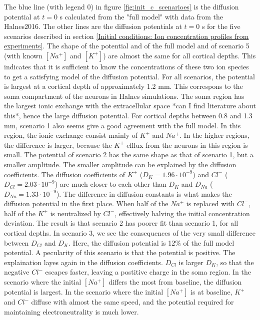 \documentclass{article}
\begin{document}
The blue line (with legend 0) in figure \ref{fig:init_c_scenarioes} is the diffusion potential at $t=0$ s calculated from the "full model" with data from the Halnes2016. The other lines are the diffusion potentials at $t=0$ s for the five scenarios described in section \ref{Initial conditions: Ion concentration profiles from experiments}.  The shape of the potential and of the full model and of scenario 5 (with known $[Na^+]$ and $[K^+]$) are almost the same for all cortical depths. This indicates that it is sufficient to know the concentrations of these two ion species to get a satisfying model of the diffusion potential. For all scenarios, the potential is largest at a cortical depth of approximately 1.2 mm. This correspons to the soma compartment of the neurons in Halnes simulations. The soma region has the largest ionic exchange with the extracellular space *can I find literature about this*, hence the large diffusion potential. For cortical depths between 0.8 and 1.3 mm, scenario 1 also seems give a good agreement with the full model. In this region, the ionic exchange consist mainly of $K^+$ and $Na^+$. In the higher regions, the difference is larger, because the $K^+$ efflux from the neurons in this region is small. The potential of scenario 2 has the same shape as that of scenario 1, but a smaller amplitude. The smaller amplitude can be explained by the diffusion coefficients. The diffusion coefficients of $K^+$ ($D_K = 1.96\cdot 10^{-9}$) and $Cl^-$ ($D_{Cl} = 2.03\cdot 10^{-9}$) are much closer to each other than $D_K$ and $D_{Na}$ ($D_{Na} = 1.33\cdot 10^{-9}$).  The difference in diffusion constants is what makes the diffusion potential in the first place. When half of the $Na^+ $ is replaced with $Cl^-$, half of the $K^+$ is neutralized by $Cl^-$, effectively halving the initial concentration deviation. The result is that scenario 2 has poorer fit than scenario 1, for all cortical depths. In scenario 3, we see the consequences of the very small difference between $D_{Cl}$ and $D_K$. Here, the diffusion potential is 12\% of the full model potential. A pecularity of this scenario is that the potential is positive. The explaination layes again in the diffusion coefficients. $D_{Cl}$ is larger $D_K$, so that the negative $Cl^-$ escapes faster, leaving a postitive charge in the soma region. In the scenario where the initial $[Na^+]$ differs the most from baseline, the diffusion potential is largest. In the scenario where the initial $[Na^+]$ is at baseline, $K^+$ and $Cl^-$ diffuse with almost the same speed, and the potential required for maintaining electroneutrality is much lower. 
\end{document}
